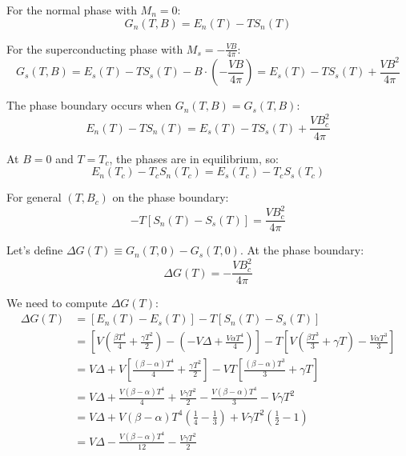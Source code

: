 \documentclass[10pt,twocoloumn]{article}
\begin{document}
For the normal phase with $M_n = 0$:
\begin{equation}G_n(T,B) = E_n(T) - TS_n(T)\end{equation}

For the superconducting phase with $M_s = -\frac{VB}{4\pi}$:
\begin{equation}G_s(T,B) = E_s(T) - TS_s(T) - B \cdot \left(-\frac{VB}{4\pi}\right) = E_s(T) - TS_s(T) + \frac{VB^2}{4\pi}\end{equation}

The phase boundary occurs when $G_n(T,B) = G_s(T,B)$:
\begin{equation}E_n(T) - TS_n(T) = E_s(T) - TS_s(T) + \frac{VB_c^2}{4\pi}\end{equation}

At $B=0$ and $T=T_c$, the phases are in equilibrium, so:
\begin{equation}E_n(T_c) - T_c S_n(T_c) = E_s(T_c) - T_c S_s(T_c)\end{equation}

For general $(T, B_c)$ on the phase boundary:
\begin{equation}[E_n(T) - E_s(T)] - T[S_n(T) - S_s(T)] = \frac{VB_c^2}{4\pi}\end{equation}

Let's define $\Delta G(T) \equiv G_n(T,0) - G_s(T,0)$. At the phase boundary:
\begin{equation}\Delta G(T) = -\frac{VB_c^2}{4\pi}\end{equation}

We need to compute $\Delta G(T)$:
\begin{align}
    \Delta G(T) &= [E_n(T) - E_s(T)] - T[S_n(T) - S_s(T)]\\
    &= \left[V\left(\frac{\beta T^4}{4} + \frac{\gamma T^2}{2}\right) - \left(-V\Delta + \frac{V\alpha T^4}{4}\right)\right] - T\left[V\left(\frac{\beta T^3}{3} + \gamma T\right) - \frac{V\alpha T^3}{3}\right]\\
&= V\Delta + V\left[\frac{(\beta - \alpha)T^4}{4} + \frac{\gamma T^2}{2}\right] - VT\left[\frac{(\beta - \alpha)T^3}{3} + \gamma T\right]\\
&= V\Delta + \frac{V(\beta - \alpha)T^4}{4} + \frac{V\gamma T^2}{2} - \frac{V(\beta - \alpha)T^4}{3} - V\gamma T^2\\
&= V\Delta + V(\beta - \alpha)T^4\left(\frac{1}{4} - \frac{1}{3}\right) + V\gamma T^2\left(\frac{1}{2} - 1\right)\\
&= V\Delta - \frac{V(\beta - \alpha)T^4}{12} - \frac{V\gamma T^2}{2}\end{align}
\end{document}

